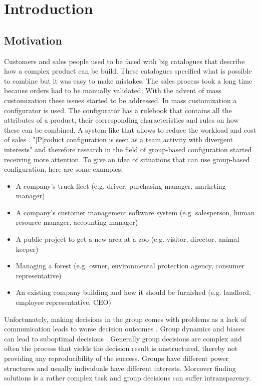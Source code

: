 \chapter{Introduction}
\label{ch:Introduction}

\section{Motivation}
\label{sec:Introduction:Goals}

Customers and sales people used to be faced with big catalogues that describe how a complex product can be build. These catalogues specified what is possible to combine but it was easy to make mistakes. The sales process took a long time because orders had to be manually validated. With the advent of mass customization these issues started to be addressed. In mass customization a configurator is used. The configurator has a rulebook that contains all the attributes of a product, their corresponding characteristics and rules on how these can be combined. A system like that allows to reduce the workload and cost of sales \cite{shafieeCostBenefitAnalysis2018}. "[P]roduct configuration is seen as a team activity with divergent interests" \cite{mendoncaCollaborativeProductConfiguration2008} and therefore research in the field of group-based configuration started receiving more attention. 
To give an idea of situations that can use group-based configuration, here are some examples:
\begin{itemize}
    \item A company's truck fleet (e.g. driver, purchasing-manager, marketing manager)
    \item A company's customer management software system (e.g. salesperson, human resource manager, accounting manager)
    \item A public project to get a new area at a zoo (e.g. visitor, director, animal keeper)
    \item Managing a forest (e.g. owner, environmental protection agency, consumer representative)
    \item An existing company building and how it should be furnished (e.g. landlord, employee representative, CEO)
\end{itemize}

Unfortunately, making decisions in the group comes with problems as a lack of communication leads to worse decision outcomes \cite{atasItemRecommendationUsing2017}. Group dynamics and biases can lead to suboptimal decisions \cite{kerrBiasJudgmentComparing1996}.
Generally group decisions are complex and often the process that yields the decision result is unstructured, thereby not providing any reproducibility of the success. Groups have different power structures and usually individuals have different interests. Moreover finding solutions is a rather complex task and group decisions can suffer intransparency.

